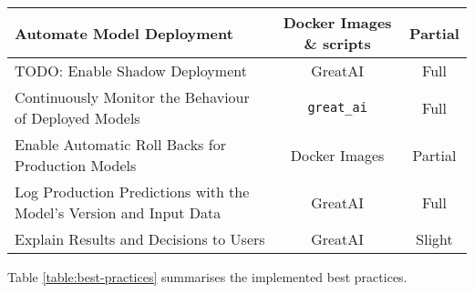 \begin{table}
\begin{tabular}{p{7cm}@{\hskip 0.5cm}c@{\hskip 0.5cm}c}
Automate Model Deployment & Docker Images \& scripts & Partial \\\hline
TODO: Enable Shadow Deployment & GreatAI & Full \\\hline
Continuously Monitor the Behaviour of Deployed Models & \texttt{great\_ai} & Full \\\hline
Enable Automatic Roll Backs for Production Models &  Docker Images & Partial \\\hline
Log Production Predictions with the Model's Version and Input Data & GreatAI & Full \\\hline

Explain Results and Decisions to Users & GreatAI & Slight \\\hline
\end{tabular}
\end{table}


Table \ref{table:best-practices} summarises the implemented best practices.
